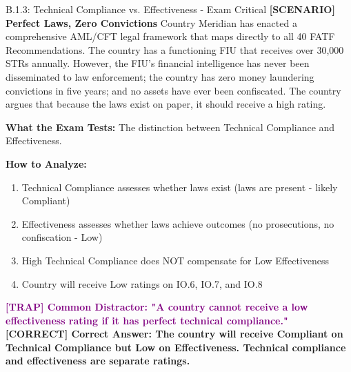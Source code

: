 \documentclass[11pt,a4paper]{beamer}
\newcommand{\trap}[1]{\textcolor{purple}{\textbf{[TRAP] #1}}}
\newcommand{\correct}[1]{\textcolor{green!50!black}{\textbf{[CORRECT] #1}}}
\newcommand{\scenario}[1]{\textcolor{blue!70!black}{\textbf{[SCENARIO] #1}}}
\begin{document}
	\begin{frame}{B.1.3: Technical Compliance vs. Effectiveness - Exam Critical}
		\scenario{Perfect Laws, Zero Convictions}
		Country Meridian has enacted a comprehensive AML/CFT legal framework that maps directly to all 40 FATF Recommendations. The country has a functioning FIU that receives over 30,000 STRs annually. However, the FIU's financial intelligence has never been disseminated to law enforcement; the country has zero money laundering convictions in five years; and no assets have ever been confiscated. The country argues that because the laws exist on paper, it should receive a high rating.
		
		\vspace{0.1cm}
		\textbf{What the Exam Tests:} The distinction between Technical Compliance and Effectiveness.
		
		\vspace{0.1cm}
		\textbf{How to Analyze:}
		\begin{enumerate}
			\item Technical Compliance assesses whether laws exist (laws are present - likely Compliant)
			\item Effectiveness assesses whether laws achieve outcomes (no prosecutions, no confiscation - Low)
			\item High Technical Compliance does NOT compensate for Low Effectiveness
			\item Country will receive Low ratings on IO.6, IO.7, and IO.8
		\end{enumerate}
		
		\trap{Common Distractor: "A country cannot receive a low effectiveness rating if it has perfect technical compliance."}
		\correct{Correct Answer: The country will receive Compliant on Technical Compliance but Low on Effectiveness. Technical compliance and effectiveness are separate ratings.}
	\end{frame}
	
\end{document}
